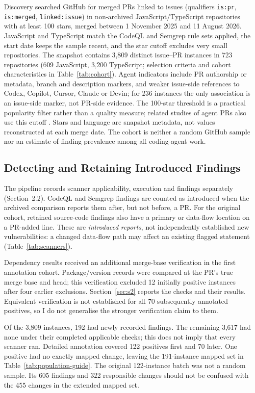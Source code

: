 \documentclass[acmsmall,screen,nonacm]{acmart}
\begin{document}
Discovery searched GitHub for merged PRs linked to issues (qualifiers \texttt{is:pr}, \texttt{is:merged}, \texttt{linked:issue}) in non-archived JavaScript/\allowbreak TypeScript repositories with at least 100 stars, merged between 1 November 2025 and 11 August 2026. JavaScript and TypeScript match the CodeQL and Semgrep rule sets applied, the start date keeps the sample recent, and the star cutoff excludes very small repositories. The snapshot contains 3,809 distinct issue--PR instances in 723 repositories (609 JavaScript, 3,200 TypeScript; selection criteria and cohort characteristics in Table~\ref{tab:cohort}). Agent indicators include PR authorship or metadata, branch and description markers, and weaker issue-side references to Codex, Copilot, Cursor, Claude or Devin; for 236 instances the only association is an issue-side marker, not PR-side evidence. The 100-star threshold is a practical popularity filter rather than a quality measure; related studies of agent PRs also use this cutoff \cite{b37,b38}. Stars and language are snapshot metadata, not values reconstructed at each merge date. The cohort is neither a random GitHub sample nor an estimate of finding prevalence among all coding-agent work.

\subsection{Detecting and Retaining Introduced Findings}

The pipeline records scanner applicability, execution and findings separately (Section~2.2). CodeQL and Semgrep findings are counted as introduced when the archived comparison reports them after, but not before, a PR. For the original cohort, retained source-code findings also have a primary or data-flow location on a PR-added line. These are \emph{introduced reports}, not independently established new vulnerabilities: a changed data-flow path may affect an existing flagged statement (Table~\ref{tab:scanners}).

Dependency results received an additional merge-base verification in the first annotation cohort. Package/version records were compared at the PR's true merge base and head; this verification excluded 12 initially positive instances after four earlier exclusions. Section~\ref{sec:s2} reports the checks and their results. Equivalent verification is not established for all 70 subsequently annotated positives, so I do not generalise the stronger verification claim to them.

Of the 3,809 instances, 192 had newly recorded findings. The remaining 3,617 had none under their completed applicable checks; this does not imply that every scanner ran. Detailed annotation covered 122 positives first and 70 later. One positive had no exactly mapped change, leaving the 191-instance mapped set in Table~\ref{tab:population-guide}. The original 122-instance batch was not a random sample. Its 605 findings and 322 responsible changes should not be confused with the 455 changes in the extended mapped set.
\end{document}
